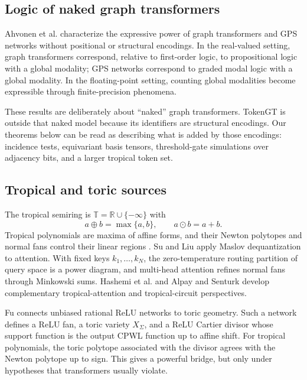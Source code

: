 \documentclass[11pt]{article}
\newcommand{\R}{\mathbb{R}}
\newcommand{\tropadd}{\oplus}
\newcommand{\tropmul}{\odot}
\newcommand{\maxplus}{\mathbb{T}}
\begin{document}
\subsection{Logic of naked graph transformers}

Ahvonen et al. \cite{ahvonen2026logic} characterize the expressive power of graph transformers and GPS networks without positional or structural encodings.  In the real-valued setting, graph transformers correspond, relative to first-order logic, to propositional logic with a global modality; GPS networks correspond to graded modal logic with a global modality.  In the floating-point setting, counting global modalities become expressible through finite-precision phenomena.

These results are deliberately about ``naked'' graph transformers.  TokenGT is outside that naked model because its identifiers are structural encodings.  Our theorems below can be read as describing what is added by those encodings: incidence tests, equivariant basis tensors, threshold-gate simulations over adjacency bits, and a larger tropical token set.

\subsection{Tropical and toric sources}

The tropical semiring is $\maxplus=\R\cup\{-\infty\}$ with
\[
  a\tropadd b=\max\{a,b\},
  \qquad
  a\tropmul b=a+b.
\]
Tropical polynomials are maxima of affine forms, and their Newton polytopes and normal fans control their linear regions \cite{maclagan2015tropical,zhang2018tropical}.  Su and Liu \cite{su2026tropicalexpressivity} apply Maslov dequantization to attention.  With fixed keys $k_1,\dots,k_N$, the zero-temperature routing partition of query space is a power diagram, and multi-head attention refines normal fans through Minkowski sums.  Hashemi et al. \cite{hashemi2025tropicalattention} and Alpay and Senturk \cite{alpay2026geometry} develop complementary tropical-attention and tropical-circuit perspectives.

Fu \cite{fu2025toricrelu} connects unbiased rational ReLU networks to toric geometry.  Such a network defines a ReLU fan, a toric variety $X_\Sigma$, and a ReLU Cartier divisor whose support function is the output CPWL function up to affine shift.  For tropical polynomials, the toric polytope associated with the divisor agrees with the Newton polytope up to sign.  This gives a powerful bridge, but only under hypotheses that transformers usually violate.
\end{document}
